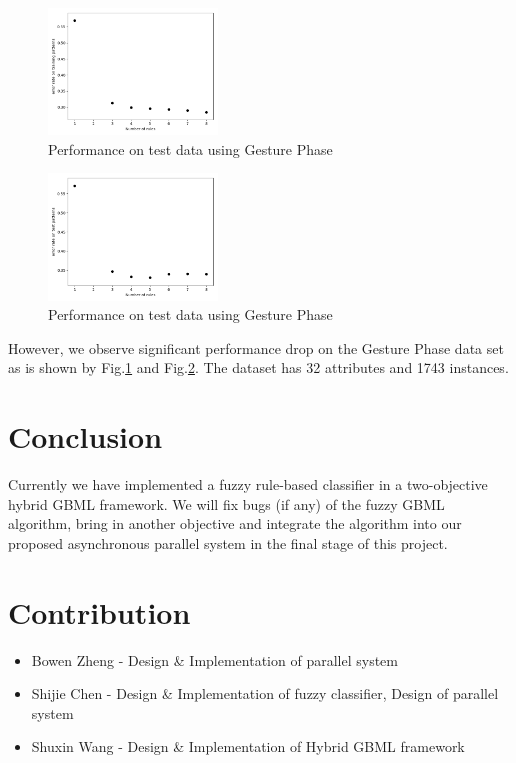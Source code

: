 \documentclass[conference]{IEEEtran}
\begin{document}
 \begin{figure}[H]
 	\centering
 	\includegraphics[width=0.4\textwidth]{figures/test.png}
 	\caption{Performance on test data using Gesture Phase}\label{phTr}
 \end{figure}
  \begin{figure}[H]
 	\centering
 	\includegraphics[width=0.4\textwidth]{figures/testData.png}
 	\caption{Performance on test data using Gesture Phase}\label{phT}
 \end{figure}
However, we observe significant performance drop on the Gesture Phase data set as is shown by Fig.\ref{phTr} and Fig.\ref{phT}. The dataset has 32 attributes and 1743 instances.
 \section{Conclusion}
 Currently we have implemented a fuzzy rule-based classifier in a two-objective hybrid GBML framework. We will fix bugs (if any) of the fuzzy GBML algorithm, bring in another objective and integrate the algorithm into our proposed asynchronous parallel system in the final stage of this project. 

  \section{Contribution}
  
    \begin{itemize}
    \item Bowen Zheng - Design \& Implementation of parallel system
    \item Shijie Chen - Design \& Implementation of fuzzy classifier, Design of parallel system
    \item Shuxin Wang - Design \& Implementation of Hybrid GBML framework
    \end{itemize}



\end{document}
